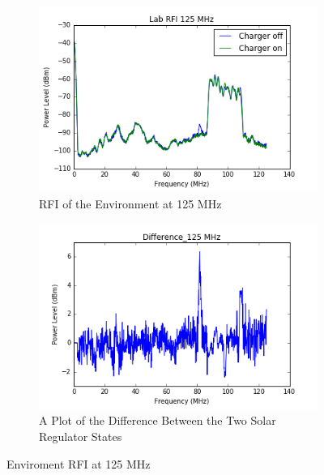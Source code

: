 \documentclass[12pt,a4paper]{report}
\begin{document}
\begin{figure}[!htb]
	\centering
	\begin{subfigure}{.5\textwidth}
		\centering
		\includegraphics[width=.9\linewidth]{Figures/lab_rfi_charger_on_off_125MHz.png}
		\caption{RFI of the Environment at 125 MHz}
		\label{Fig:1251}
	\end{subfigure}%
	\begin{subfigure}{.5\textwidth}
		\centering
		\includegraphics[width=.9\linewidth]{Figures/Difference_125mhz.png}
		\caption{A Plot of the Difference Between the Two Solar Regulator States}
		\label{Fig:dif1251}
	\end{subfigure}
	\caption{Enviroment RFI at 125 MHz}
	\label{Fig:4}
\end{figure}
\end{document}

